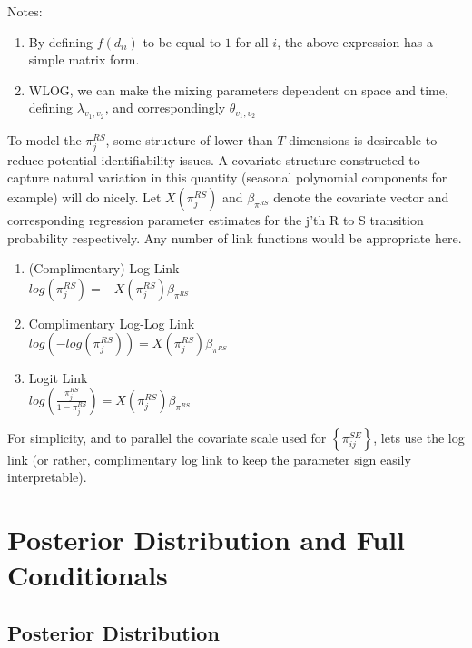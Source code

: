 \documentclass[12pt]{article}
\begin{document}
Notes: 
\begin{enumerate}
    \item By defining $f(d_{ii})$ to be equal to $1$ for all $i$, the above expression has a simple 
        matrix form. 
    \item WLOG, we can make the mixing parameters dependent on space and time, defining $\lambda_{v_1, v_2}$,
        and correspondingly $\theta_{v_1,v_2}$

\end{enumerate}
To model the $\pi_j^{RS}$, some structure of lower than $T$ dimensions is desireable to reduce potential 
identifiability issues. A covariate structure constructed to capture natural variation in this quantity 
(seasonal polynomial components for example) will do nicely. Let $X(\pi_j^{RS})$ and $\beta_{\pi^{RS}}$ 
denote the covariate vector and corresponding regression parameter estimates 
for the j'th R to S transition probability respectively. Any number of link functions would be appropriate here.
 
\begin{enumerate}
    \item (Complimentary) Log Link \\
    $log(\pi_j^{RS}) = -X(\pi_j^{RS}) \beta_{\pi^{RS}}$
    \item Complimentary Log-Log Link \\
    $log(-log(\pi_j^{RS})) = X(\pi_j^{RS}) \beta_{\pi^{RS}}$
    \item Logit Link \\
    $log(\frac{\pi_j^{RS}}{1-\pi_j^{RS}}) = X(\pi_j^{RS}) \beta_{\pi^{RS}}$
\end{enumerate}

For simplicity, and to parallel the covariate scale used for $\left\{\pi_{ij}^{SE} \right\}$, lets 
use the log link (or rather, complimentary log link to keep the parameter sign easily interpretable).

\section{Posterior Distribution and Full Conditionals}

\subsection{Posterior Distribution}
\end{document}
